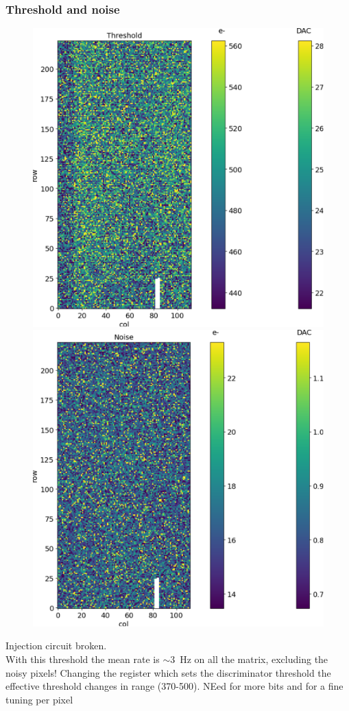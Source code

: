     \begin{frame}
        \frametitle{Threshold and noise}

            \begin{figure}
                \includegraphics[width=.45\linewidth]{figures/charaterization/threshold_map.pdf}
                \includegraphics[width=.45\linewidth]{figures/charaterization/noise_map.pdf}                
            \end{figure}

        Injection circuit broken.\\
        With this threshold the mean rate is $\sim$\SI{3}{Hz} on all the matrix, excluding the noisy pixels!
        Changing the register which sets the discriminator threshold the effective threshold changes in range (370-500). NEed for more bits and for a fine tuning per pixel
    \end{frame}

